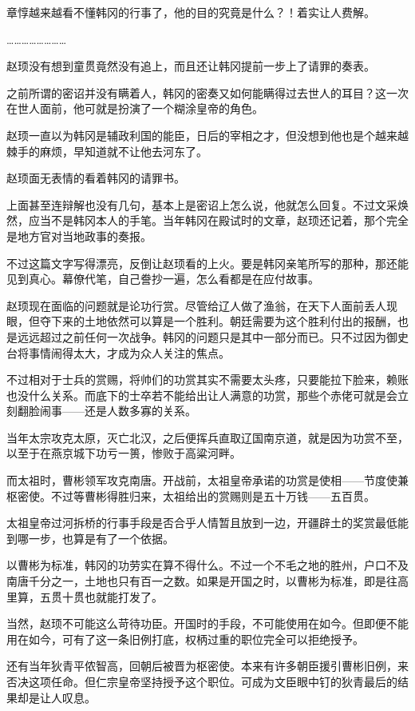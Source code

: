 章惇越来越看不懂韩冈的行事了，他的目的究竟是什么？！着实让人费解。

……………………

赵顼没有想到童贯竟然没有追上，而且还让韩冈提前一步上了请罪的奏表。

之前所谓的密诏并没有瞒着人，韩冈的密奏又如何能瞒得过去世人的耳目？这一次在世人面前，他可就是扮演了一个糊涂皇帝的角色。

赵顼一直以为韩冈是辅政利国的能臣，日后的宰相之才，但没想到他也是个越来越棘手的麻烦，早知道就不让他去河东了。

赵顼面无表情的看着韩冈的请罪书。

上面甚至连辩解也没有几句，基本上是密诏上怎么说，他就怎么回复。不过文采焕然，应当不是韩冈本人的手笔。当年韩冈在殿试时的文章，赵顼还记着，那个完全是地方官对当地政事的奏报。

不过这篇文字写得漂亮，反倒让赵顼看的上火。要是韩冈亲笔所写的那种，那还能见到真心。幕僚代笔，自己誊抄一遍，怎么看都是在应付故事。

赵顼现在面临的问题就是论功行赏。尽管给辽人做了渔翁，在天下人面前丢人现眼，但夺下来的土地依然可以算是一个胜利。朝廷需要为这个胜利付出的报酬，也是远远超过之前任何一次战争。韩冈的问题只是其中一部分而已。只不过因为御史台将事情闹得太大，才成为众人关注的焦点。

不过相对于士兵的赏赐，将帅们的功赏其实不需要太头疼，只要能拉下脸来，赖账也没什么关系。而底下的士卒若不能给出让人满意的功赏，那些个赤佬可就是会立刻翻脸闹事——还是人数多寡的关系。

当年太宗攻克太原，灭亡北汉，之后便挥兵直取辽国南京道，就是因为功赏不至，以至于在燕京城下功亏一篑，惨败于高粱河畔。

而太祖时，曹彬领军攻克南唐。开战前，太祖皇帝承诺的功赏是使相——节度使兼枢密使。不过等曹彬得胜归来，太祖给出的赏赐则是五十万钱——五百贯。

太祖皇帝过河拆桥的行事手段是否合乎人情暂且放到一边，开疆辟土的奖赏最低能到哪一步，也算是有了一个依据。

以曹彬为标准，韩冈的功劳实在算不得什么。不过一个不毛之地的胜州，户口不及南唐千分之一，土地也只有百一之数。如果是开国之时，以曹彬为标准，即是往高里算，五贯十贯也就能打发了。

当然，赵顼不可能这么苛待功臣。开国时的手段，不可能使用在如今。但即便不能用在如今，可有了这一条旧例打底，权柄过重的职位完全可以拒绝授予。

还有当年狄青平侬智高，回朝后被晋为枢密使。本来有许多朝臣援引曹彬旧例，来否决这项任命。但仁宗皇帝坚持授予这个职位。可成为文臣眼中钉的狄青最后的结果却是让人叹息。

